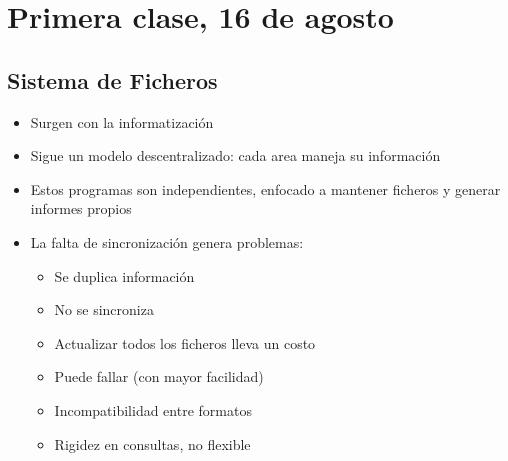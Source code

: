 \section{Primera clase, 16 de agosto}

\subsection{Sistema de Ficheros}
\begin{itemize}
    \item Surgen con la informatización
    \item Sigue un modelo descentralizado: cada area maneja su información
    \item Estos programas son independientes, enfocado a mantener ficheros
          y generar informes propios
    \item La falta de sincronización genera problemas:
          \begin{itemize}
              \item Se duplica información
              \item No se sincroniza
              \item Actualizar todos los ficheros lleva un costo
              \item Puede fallar (con mayor facilidad)
              \item Incompatibilidad entre formatos
              \item Rigidez en consultas, no flexible
          \end{itemize}
\end{itemize}

